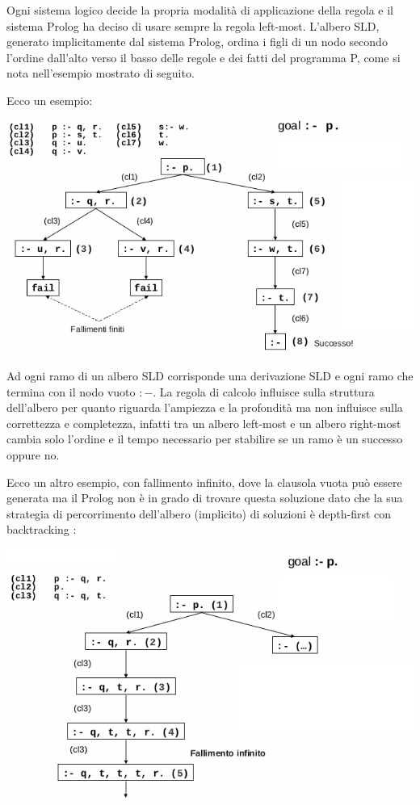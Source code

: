 Ogni sistema logico decide la propria modalità di applicazione della regola e il sistema Prolog ha deciso di
usare sempre la regola left-most.\newline
L'albero SLD, generato implicitamente dal sistema Prolog, ordina i figli di un nodo secondo l'ordine dall'alto verso il basso
delle regole e dei fatti del programma P, come si nota nell'esempio mostrato di seguito.
\begin{esempio}
Ecco un esempio:
\begin{center}
\includegraphics[scale=0.7]{img/alb.png}
\end{center}
\end{esempio}
Ad ogni ramo di un albero SLD corrisponde una derivazione SLD e ogni ramo che termina con il nodo vuoto $:-$.\newline
La regola di calcolo influisce sulla struttura dell'albero per quanto riguarda l'ampiezza e la profondità ma non influisce
sulla correttezza e completezza, infatti tra un albero left-most e un albero right-most cambia solo l'ordine e il tempo necessario
per stabilire se un ramo è un successo oppure no.
\begin{esempio}
  Ecco un altro esempio, con fallimento infinito, dove la clausola vuota può essere generata ma il Prolog non è in grado di trovare
  questa soluzione dato che la sua strategia di percorrimento dell’albero (implicito) di soluzioni è depth-first con backtracking :
\begin{center}
\includegraphics[scale=0.7]{img/alb2.png}
\end{center}
\end{esempio}
